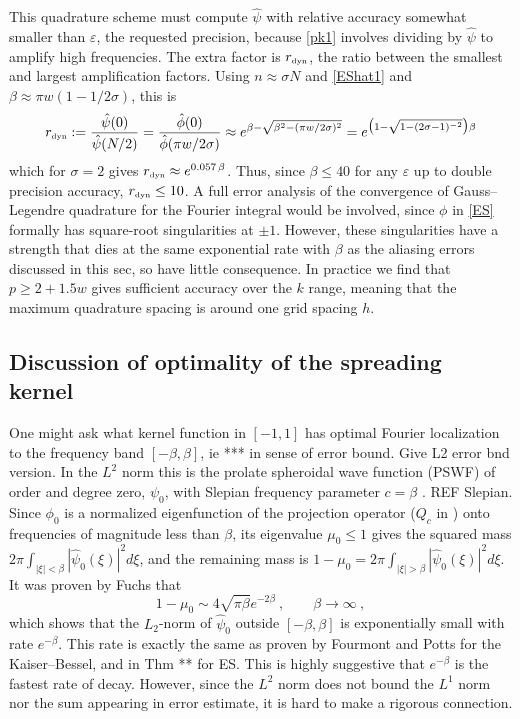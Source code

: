 \documentclass[10pt]{article}
\newcommand{\be}{\begin{equation}}
\newcommand{\ee}{\end{equation}}
\newcommand{\tbox}[1]{{\mbox{\tiny #1}}}
\newcommand{\eps}{\varepsilon}
\newcommand{\freq}{\beta}          %
\newcommand{\rat}{\sigma}          %
\newcommand{\rmax}{r_\tbox{dyn}}    %
\newcommand{\KB}{Kaiser--Bessel}
\begin{document}
This quadrature scheme must compute $\hat\psi$
with relative accuracy
somewhat smaller than $\eps$, the requested precision,
because \eqref{pk1} involves dividing by $\hat\psi$ to amplify
high frequencies.
The extra factor is $\rmax$, the ratio between the smallest and largest
amplification factors. Using $n\approx \rat N$ and
\eqref{EShat1} and $\beta \approx \pi w( 1- 1/2\rat)$,
this is
\be
\rmax := \frac{\hat\psi(0)}{\hat\psi(N/2)}
= \frac{\hat\phi(0)}{\hat\phi(\pi w/2\rat)}
\approx e^{\freq - \sqrt{\freq^2 - (\pi w/2\rat)^2}}
= e^{\bigl(1 - \sqrt{1-(2\rat-1)^{-2}}\bigr)\freq}
\label{rmax}
\ee
which for $\rat=2$ gives $\rmax \approx e^{0.057\,\freq}$.
Thus, since $\beta\le40$ for any $\eps$
up to double precision accuracy, $\rmax\le 10$.
A full error analysis of the convergence of Gauss--Legendre quadrature
for the Fourier integral would be involved, since $\phi$ in \eqref{ES}
formally has square-root singularities at $\pm 1$.
However, these singularities have a strength that dies at the same
exponential rate with $\freq$
as the aliasing errors discussed in this sec, so have
little consequence.
In practice we find that $p\ge 2+1.5 w$ gives sufficient accuracy
over the $k$ range,
meaning that the maximum quadrature spacing is around one
grid spacing $h$.






\subsection{Discussion of optimality of the spreading kernel}
\label{s:optim}

One might ask what kernel function in $[-1,1]$ has optimal Fourier localization
to the frequency band $[-\freq,\freq]$,
ie *** in sense of error bound.
Give L2 error bnd version.
In the $L^2$ norm this is the prolate spheroidal wave function (PSWF)
of order and degree zero, $\psi_0$,
with Slepian frequency parameter $c=\freq$
\cite{osipov}. REF Slepian.
Since $\phi_0$ is a normalized eigenfunction of the projection operator
($Q_c$ in \cite{osipov}) onto frequencies
of magnitude less than $\freq$,
its eigenvalue $\mu_0\le 1$ gives the
squared mass
$2\pi \int_{|\xi|<\freq}|\hat\psi_0(\xi)|^2 d\xi$,
and the remaining mass is
$1-\mu_0 =2\pi \int_{|\xi|>\freq}|\hat\psi_0(\xi)|^2 d\xi$.
It was proven by Fuchs \cite{fuchs} that
\be
1 - \mu_0 \sim 4\sqrt{\pi\freq} e^{-2\freq} ~, \qquad \freq\to\infty~,
\label{fuchs}
\ee
which shows that the $L_2$-norm of $\hat\psi_0$ outside
$[-\freq,\freq]$ is exponentially small with rate $e^{-\freq}$.
This rate is exactly the same as
proven by Fourmont and Potts for the \KB, and in Thm ** for ES.
This is highly suggestive that $e^{-\freq}$ is the fastest
rate of decay.
However, since the $L^2$ norm does not bound the $L^1$ norm
nor the sum appearing in error estimate,
it is hard to make a rigorous connection.
\end{document}
